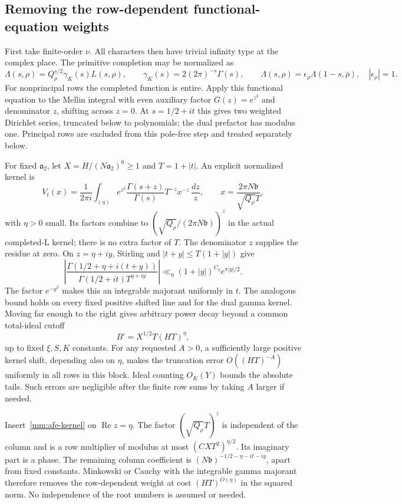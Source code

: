 \documentclass[11pt,oneside,openany]{book}
\theoremstyle{definition}\newtheorem{definition}[theorem]{Definition}
\theoremstyle{remark}\newtheorem{remark}[theorem]{Remark}
\begin{document}
\subsection{Removing the row-dependent functional-equation weights}
First take finite-order $\nu$. All characters then have trivial infinity
type at the complex place. The primitive completion may be normalized as
\[
 \Lambda(s,\rho)=Q_\rho^{s/2}\gamma_K(s)L(s,\rho),\qquad
 \gamma_K(s)=2(2\pi)^{-s}\Gamma(s),\qquad
 \Lambda(s,\rho)=\epsilon_\rho\Lambda(1-s,\bar\rho),
 \quad |\epsilon_\rho|=1.
\]
For nonprincipal rows the completed function is entire. Apply this
functional equation to the Mellin integral with even auxiliary factor
$G(z)=e^{z^2}$ and denominator $z$, shifting across $z=0$. At
$s=1/2+it$ this gives two weighted Dirichlet series, truncated below to
polynomials; the dual prefactor has modulus one. Principal rows are excluded from
this pole-free step and treated separately below.

For fixed $\mathfrak a_2$, let $X=H/(N\mathfrak a_2)^6\ge1$ and
$T=1+|t|$. An explicit normalized kernel is
\begin{equation}\label{mm:afe-kernel}
 V_t(x)=\frac1{2\pi i}\int_{(\eta)}
 e^{z^2}\frac{\Gamma(s+z)}{\Gamma(s)}T^{-z}x^{-z}\,\frac{dz}{z},
 \qquad x=\frac{2\pi N\mathfrak b}{\sqrt{Q_\rho}T},
\end{equation}
with $\eta>0$ small. Its factors combine to
$(\sqrt{Q_\rho}/(2\pi N\mathfrak b))^z$ in the actual completed-L
kernel; there is no extra factor of $T$. The denominator $z$ supplies
the residue at zero.
On $z=\eta+iy$, Stirling and $|t+y|\le T(1+|y|)$ give
\[
 \left|\frac{\Gamma(1/2+\eta+i(t+y))}
                 {\Gamma(1/2+it)T^{\eta+iy}}\right|
 \ll_\eta (1+|y|)^{C_\eta}e^{\pi|y|/2}.
\]
The factor $e^{-y^2}$ makes this an integrable majorant uniformly in
$t$. The analogous bound holds on every fixed positive shifted line
and for the dual gamma kernel. Moving far enough to the right gives
arbitrary power decay beyond a common total-ideal cutoff
\begin{equation}\label{mm:common-cutoff}
 B'=X^{1/2}T(HT)^\eta,
\end{equation}
up to fixed $\xi,S,K$ constants. For any requested $A>0$, a sufficiently
large positive kernel shift, depending also on $\eta$, makes the
truncation error $O((HT)^{-A})$ uniformly in all rows in this block.
Ideal counting $O_K(Y)$ bounds the absolute tails. Such errors are
negligible after the finite row sums by taking $A$ larger if needed.

Insert~\eqref{mm:afe-kernel} on $\operatorname{Re}z=\eta$.
The factor $(\sqrt{Q_\rho}T)^z$ is independent of the column and is a
row multiplier of modulus at most $(CXT^2)^{\eta/2}$.
Its imaginary part is a phase. The remaining column coefficient is
$(N\mathfrak b)^{-1/2-\eta-it-iy}$, apart from fixed constants.
Minkowski or Cauchy with the integrable gamma majorant therefore removes
the row-dependent weight at cost $(HT)^{O(\eta)}$ in the squared norm.
No independence of the root numbers is assumed or needed.
\end{document}
